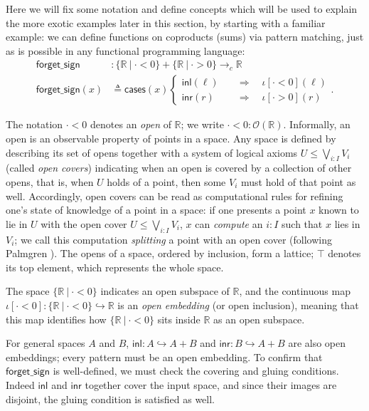 \documentclass[conference]{IEEEtran}
\newcommand{\hookto}{\hookrightarrow}
\newcommand{\cto}{\to_c}
\newcommand{\R}{\mathbb{R}}
\newcommand{\suchthat}{\ |\ }
\newcommand{\Open}[1]{\mathcal{O}({#1})}
\newcommand{\oinclf}[1]{\iota[{#1}]}
\newcommand{\oincl}[2]{\oinclf{#1} \left({#2}\right)}
\newcommand{\Branch}{\Rightarrow}
\begin{document}
Here we will fix some notation and define concepts which will be used to explain the more exotic examples later in this section, by starting with a familiar example: we can define functions on coproducts (sums) via pattern matching, just as is possible in any functional programming language:
\begin{align*}
\mathsf{forget\_sign} &: \{ \R \suchthat \cdot < 0 \} + \{ \R \suchthat \cdot > 0 \} \cto \R
\\ \mathsf{forget\_sign}(x) &\triangleq
  \mathsf{cases}(x)
  \begin{cases}
  \mathsf{inl}(\ell) \quad &\Branch \quad \oincl{\cdot < 0}{\ell}
  \\ \mathsf{inr}(r) \quad &\Branch \quad \oincl{\cdot > 0}{r}
  \end{cases}.
\end{align*}

The notation $\cdot < 0$ denotes an \emph{open} of $\R$; we write $\cdot < 0 : \Open{\R}$. Informally, an open is an observable property of points in a space. Any space is defined by describing its set of opens together with a system of logical axioms $U \le \bigvee_{i : I} V_i$ (called \emph{open covers}) indicating when an open is covered by a collection of other opens, that is, when $U$ holds of a point, then some $V_i$ must hold of that point as well. Accordingly, open covers can be read as computational rules for refining one's state of knowledge of a point in a space: if one presents a point $x$ known to lie in $U$ with the open cover $U \le \bigvee_{i : I} V_i$, $x$ can \emph{compute} an $i : I$ such that $x$ lies in $V_i$; we call this computation \emph{splitting} a point with an open cover (following Palmgren \cite{palmgren2007}).
The opens of a space, ordered by inclusion, form a lattice; $\top$ denotes its top element, which represents the whole space.

The space $\{ \R \suchthat \cdot < 0 \}$ indicates an open subspace of $\R$, and the continuous map $\oinclf{\cdot < 0} : \{ \R \suchthat \cdot < 0 \} \hookto \R$ is an \emph{open embedding} (or open inclusion), meaning that this map identifies how $\{ \R \suchthat \cdot < 0 \}$ sits inside $\R$ as an open subspace.

For general spaces $A$ and $B$, $\mathsf{inl} : A \hookto A + B$ and $\mathsf{inr} : B \hookto A + B$ are also open embeddings; every pattern must be an open embedding. To confirm that $\mathsf{forget\_sign}$ is well-defined, we must check the covering and gluing conditions. Indeed $\mathsf{inl}$ and $\mathsf{inr}$ together cover the input space, and since their images are disjoint, the gluing condition is satisfied as well.
\end{document}
